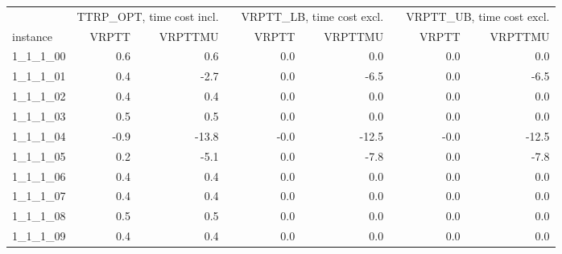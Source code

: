 \setlength\LTleft{-1in}
\setlength\LTright{-1in}
\begin{longtable}{lrrcrrcrr}
\toprule
& \multicolumn{2}{c}{TTRP\_OPT, time cost incl.} & \phantom{a}& %
\multicolumn{2}{c}{VRPTT\_LB, time cost excl.}&\phantom{a} & \multicolumn{2}{c}{VRPTT\_UB, time cost excl.} \\
\cmidrule{2-3} \cmidrule{5-6} \cmidrule{8-9}
instance &  VRPTT &  VRPTTMU &&  VRPTT &  VRPTTMU & & VRPTT &  VRPTTMU \\
\midrule \endhead
1\_1\_1\_00      &                 0.6 &                   0.6 &&                  0.0 &                    0.0 &&                  0.0 &                    0.0 \\
1\_1\_1\_01      &                 0.4 &                  -2.7 &&                  0.0 &                   -6.5 &&                  0.0 &                   -6.5 \\
1\_1\_1\_02      &                 0.4 &                   0.4 &&                  0.0 &                    0.0 &&                  0.0 &                    0.0 \\
1\_1\_1\_03      &                 0.5 &                   0.5 &&                  0.0 &                    0.0 &&                  0.0 &                    0.0 \\
1\_1\_1\_04      &                -0.9 &                 -13.8 &&                 -0.0 &                  -12.5 &&                 -0.0 &                  -12.5 \\
1\_1\_1\_05      &                 0.2 &                  -5.1 &&                  0.0 &                   -7.8 &&                  0.0 &                   -7.8 \\
1\_1\_1\_06      &                 0.4 &                   0.4 &&                  0.0 &                    0.0 &&                  0.0 &                    0.0 \\
1\_1\_1\_07      &                 0.4 &                   0.4 &&                  0.0 &                    0.0 &&                  0.0 &                    0.0 \\
1\_1\_1\_08      &                 0.5 &                   0.5 &&                  0.0 &                    0.0 &&                  0.0 &                    0.0 \\
1\_1\_1\_09      &                 0.4 &                   0.4 &&                  0.0 &                    0.0 &&                  0.0 &                    0.0 \\

\end{longtable}

